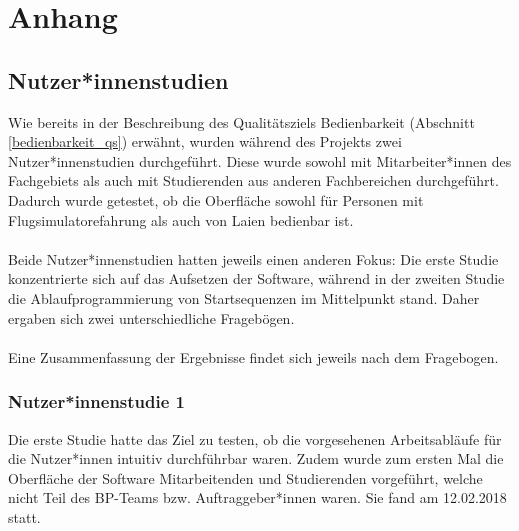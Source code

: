 \documentclass[accentcolor=tud9c,12pt,paper=a4]{tudreport}
\begin{document}
\appendix
	\chapter{Anhang}
	\section{Nutzer*innenstudien}
	Wie bereits in der Beschreibung des Qualitätsziels Bedienbarkeit (Abschnitt \ref{bedienbarkeit_qs})
	erwähnt, wurden während des Projekts zwei Nutzer*innenstudien durchgeführt. Diese wurde sowohl mit
	Mitarbeiter*innen des Fachgebiets als auch mit Studierenden aus anderen Fachbereichen durchgeführt.
	Dadurch wurde getestet, ob die Oberfläche sowohl für Personen mit Flugsimulatorefahrung als auch
	von Laien bedienbar ist.
	\\\\
	Beide Nutzer*innenstudien hatten jeweils einen anderen Fokus:
	Die erste Studie konzentrierte sich auf das Aufsetzen der Software, während in der zweiten Studie
	die Ablaufprogrammierung von Startsequenzen im Mittelpunkt stand. Daher ergaben sich zwei unterschiedliche
	Fragebögen. 
	\\\\
	Eine Zusammenfassung der Ergebnisse findet sich jeweils nach dem Fragebogen.

	\subsection{Nutzer*innenstudie 1}
	Die erste Studie hatte das Ziel zu testen, ob die vorgesehenen Arbeitsabläufe für die Nutzer*innen
	intuitiv durchführbar waren. Zudem wurde zum ersten Mal die Oberfläche der Software Mitarbeitenden und Studierenden
	vorgeführt, welche nicht Teil des BP-Teams bzw. Auftraggeber*innen waren. Sie fand am 12.02.2018 statt.
	
	
\end{document}
